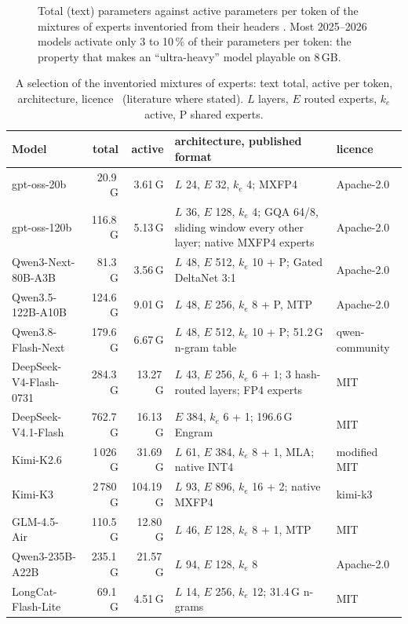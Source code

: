 \begin{figure}[ht]
\centering
\GrapheMoE
\caption[Total and active parameters of 2026 mixtures of experts]{Total (text) parameters against active parameters per token of the mixtures of experts inventoried from their headers \mes. Most 2025--2026 models activate only 3 to 10\,\% of their parameters per token: the property that makes an \enquote{ultra-heavy} model playable on 8\,GB.}
\label{fig:moe-inventaire}
\end{figure}

\begin{table}[ht]
\centering\small
\caption[The target mixtures of experts, read from their headers]{A selection of the inventoried mixtures of experts: text total, active per token, architecture, licence \mes~(literature where stated). $L$ layers, $E$ routed experts, $k_e$ active, P shared experts.}
\label{tab:moe-inventaire}
\begin{tabularx}{\linewidth}{@{}lrrXl@{}}
\toprule
Model & total & active & architecture, published format & licence \\
\midrule
gpt-oss-20b~\cite{gptoss2025} & 20.9\,G & 3.61\,G & $L$ 24, $E$ 32, $k_e$ 4; MXFP4 & Apache-2.0 \\
gpt-oss-120b~\cite{gptoss2025} & 116.8\,G & 5.13\,G & $L$ 36, $E$ 128, $k_e$ 4; GQA 64/8, sliding window every other layer; native MXFP4 experts & Apache-2.0 \\
Qwen3-Next-80B-A3B & 81.3\,G & 3.56\,G & $L$ 48, $E$ 512, $k_e$ 10 + P; Gated DeltaNet 3:1 & Apache-2.0 \\
Qwen3.5-122B-A10B & 124.6\,G & 9.01\,G & $L$ 48, $E$ 256, $k_e$ 8 + P, MTP & Apache-2.0 \\
Qwen3.8-Flash-Next & 179.6\,G & 6.67\,G & $L$ 48, $E$ 512, $k_e$ 10 + P; 51.2\,G n-gram table & qwen-community \\
DeepSeek-V4-Flash-0731~\cite{deepseekv4_2026} & 284.3\,G & 13.27\,G & $L$ 43, $E$ 256, $k_e$ 6 + 1; 3 hash-routed layers; FP4 experts & MIT \\
DeepSeek-V4.1-Flash & 762.7\,G & 16.13\,G & $E$ 384, $k_e$ 6 + 1; 196.6\,G Engram~\cite{engram2026} & MIT \\
Kimi-K2.6~\cite{kimik2_2025} & 1\,026\,G & 31.69\,G & $L$ 61, $E$ 384, $k_e$ 8 + 1, MLA; native INT4 & modified MIT \\
Kimi-K3 & 2\,780\,G & 104.19\,G & $L$ 93, $E$ 896, $k_e$ 16 + 2; native MXFP4 & kimi-k3 \\
GLM-4.5-Air~\cite{glm45_2025} & 110.5\,G & 12.80\,G & $L$ 46, $E$ 128, $k_e$ 8 + 1, MTP & MIT \\
Qwen3-235B-A22B~\cite{qwen3_2025} & 235.1\,G & 21.57\,G & $L$ 94, $E$ 128, $k_e$ 8 & Apache-2.0 \\
LongCat-Flash-Lite & 69.1\,G & 4.51\,G & $L$ 14, $E$ 256, $k_e$ 12; 31.4\,G n-grams & MIT \\
\bottomrule
\end{tabularx}
\end{table}

